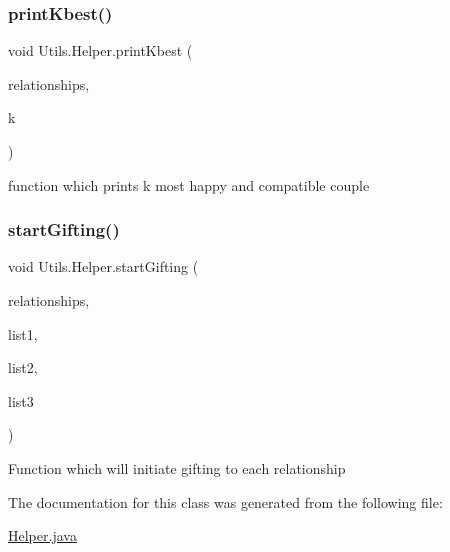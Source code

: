 \subsubsection{\texorpdfstring{print\+Kbest()}{printKbest()}}
{\footnotesize\ttfamily void Utils.\+Helper.\+print\+Kbest (\begin{DoxyParamCaption}\item[{Array\+List$<$ \hyperlink{class_utils_1_1_relationship}{Relationship} $>$}]{relationships,  }\item[{int}]{k }\end{DoxyParamCaption})\hspace{0.3cm}{\ttfamily [inline]}}

function which prints k most happy and compatible couple \mbox{\label{class_utils_1_1_helper_accb2d53aa3151a05c19f51728ee92977}} 
\subsubsection{\texorpdfstring{start\+Gifting()}{startGifting()}}
{\footnotesize\ttfamily void Utils.\+Helper.\+start\+Gifting (\begin{DoxyParamCaption}\item[{Array\+List$<$ \hyperlink{class_utils_1_1_relationship}{Relationship} $>$}]{relationships,  }\item[{Array\+List$<$ \hyperlink{class_gifts_1_1_essential_gift}{Essential\+Gift} $>$}]{list1,  }\item[{Array\+List$<$ \hyperlink{class_gifts_1_1_utility_gift}{Utility\+Gift} $>$}]{list2,  }\item[{Array\+List$<$ \hyperlink{class_gifts_1_1_luxury_gift}{Luxury\+Gift} $>$}]{list3 }\end{DoxyParamCaption})\hspace{0.3cm}{\ttfamily [inline]}}

Function which will initiate gifting to each relationship 

The documentation for this class was generated from the following file\+:\begin{DoxyCompactItemize}
\item 
\hyperlink{_helper_8java}{Helper.\+java}\end{DoxyCompactItemize}
